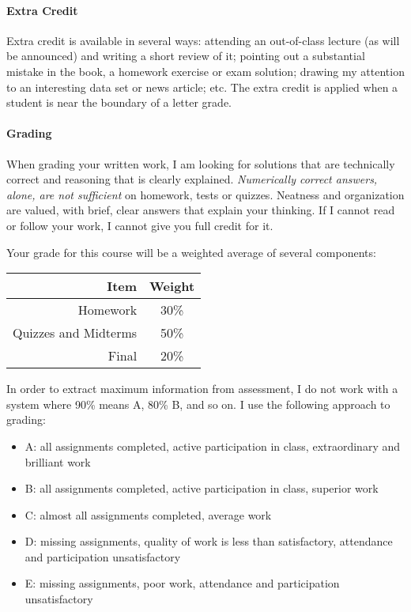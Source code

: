 \documentclass[11pt]{article}
\begin{document}
\paragraph{Extra Credit}
Extra credit is available in several ways: attending an out-of-class lecture (as will be announced) and writing a short review of it; pointing out a substantial mistake in the book, a homework exercise or exam solution; drawing my attention to an interesting data set or news article; etc. The extra credit is applied when a student is near the boundary of a letter grade.

\paragraph{Grading}
When grading your written work, I am looking for solutions that are technically correct and reasoning that is clearly explained.  \emph{Numerically correct answers, alone, are not sufficient} on homework, tests or quizzes.  Neatness and organization are valued, with brief, clear answers that explain your thinking.  If I cannot read or follow your work, I cannot give you full credit for it.

Your grade for this course will be a weighted average of several components:

\begin{table}[!h]
\centering
\begin{tabular}{r c}
\toprule
Item & Weight \\
\midrule
Homework & 30\% \\
\cmidrule(r){1-2}
\cmidrule(r){1-2}
Quizzes and Midterms & 50\% \\
\cmidrule(r){1-2}
Final & 20\% \\
\bottomrule
\end{tabular}
\end{table}

In order to extract maximum information from assessment, I do not work with a system where 90\% means A, 80\% B, and so on. I use the following approach to grading:

\begin{itemize}
	\item A: all assignments completed, active participation in class, extraordinary and brilliant work
	\item B: all assignments completed, active participation in class, superior work
	\item C: almost all assignments completed, average work
	\item D: missing assignments, quality of work is less than satisfactory, attendance and participation unsatisfactory
	\item E: missing assignments, poor work, attendance and participation unsatisfactory
\end{itemize}
\end{document}
